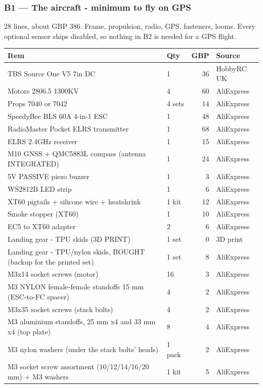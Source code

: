 \documentclass[11pt,a4paper]{article}
\begin{document}
\subsubsection*{B1 --- The aircraft - minimum to fly on GPS} 28 lines, about GBP 386.
Frame, propulsion, radio, GPS, fasteners, looms. Every optional sensor ships disabled, so nothing in B2 is needed for a GPS flight.

\begin{longtable}{@{}P{0.50\textwidth}P{0.12\textwidth}rP{0.22\textwidth}@{}}
\toprule
\textbf{Item} & \textbf{Qty} & \textbf{GBP} & \textbf{Source} \\ \midrule
\endhead
\bottomrule
\endfoot
TBS Source One V5 7in DC & 1 & 36 & HobbyRC UK \\
Motors 2806.5 1300KV & 4 & 60 & AliExpress \\
Props 7040 or 7042 & 4 sets & 14 & AliExpress \\
SpeedyBee BLS 60A 4-in-1 ESC & 1 & 48 & AliExpress \\
RadioMaster Pocket ELRS transmitter & 1 & 68 & AliExpress \\
ELRS 2.4GHz receiver & 1 & 15 & AliExpress \\
M10 GNSS + QMC5883L compass (antenna INTEGRATED) & 1 & 24 & AliExpress \\
5V PASSIVE piezo buzzer & 1 & 3 & AliExpress \\
WS2812B LED strip & 1 & 6 & AliExpress \\
XT60 pigtails + silicone wire + heatshrink & 1 kit & 12 & AliExpress \\
Smoke stopper (XT60) & 1 & 10 & AliExpress \\
EC5 to XT60 adapter & 2 & 6 & AliExpress \\
Landing gear - TPU skids (3D PRINT) & 1 set & 0 & 3D print \\
Landing gear - TPU/nylon skids, BOUGHT (backup for the printed set) & 1 set & 8 & AliExpress \\
M3x14 socket screws (motor) & 16 & 3 & AliExpress \\
M3 NYLON female-female standoffs 15 mm (ESC-to-FC spacer) & 4 & 2 & AliExpress \\
M3x35 socket screws (stack bolts) & 4 & 2 & AliExpress \\
M3 aluminium standoffs, 25 mm x4 and 33 mm x4 (top plate) & 8 & 4 & AliExpress \\
M3 nylon washers (under the stack bolts' heads) & 1 pack & 2 & AliExpress \\
M3 socket screw assortment (10/12/14/16/20 mm) + M3 washers & 1 kit & 5 & AliExpress \\

\end{longtable}
\end{document}
